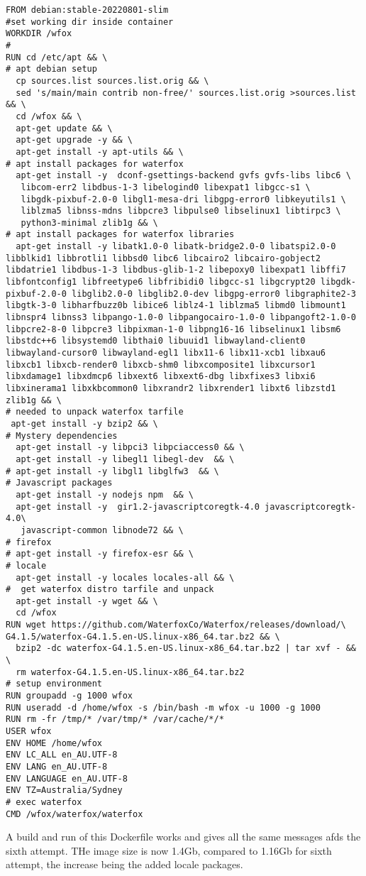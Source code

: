 \documentclass[a4paper]{article}  %
\begin{document}
\begin{tcolorbox}
\begin{verbatim}
FROM debian:stable-20220801-slim
#set working dir inside container
WORKDIR /wfox
#
RUN cd /etc/apt && \
# apt debian setup
  cp sources.list sources.list.orig && \
  sed 's/main/main contrib non-free/' sources.list.orig >sources.list && \
  cd /wfox && \
  apt-get update && \
  apt-get upgrade -y && \
  apt-get install -y apt-utils && \
# apt install packages for waterfox
  apt-get install -y  dconf-gsettings-backend gvfs gvfs-libs libc6 \
   libcom-err2 libdbus-1-3 libelogind0 libexpat1 libgcc-s1 \
   libgdk-pixbuf-2.0-0 libgl1-mesa-dri libgpg-error0 libkeyutils1 \
   liblzma5 libnss-mdns libpcre3 libpulse0 libselinux1 libtirpc3 \
   python3-minimal zlib1g && \
# apt install packages for waterfox libraries
  apt-get install -y libatk1.0-0 libatk-bridge2.0-0 libatspi2.0-0 libblkid1 libbrotli1 libbsd0 libc6 libcairo2 libcairo-gobject2 libdatrie1 libdbus-1-3 libdbus-glib-1-2 libepoxy0 libexpat1 libffi7 libfontconfig1 libfreetype6 libfribidi0 libgcc-s1 libgcrypt20 libgdk-pixbuf-2.0-0 libglib2.0-0 libglib2.0-dev libgpg-error0 libgraphite2-3 libgtk-3-0 libharfbuzz0b libice6 liblz4-1 liblzma5 libmd0 libmount1 libnspr4 libnss3 libpango-1.0-0 libpangocairo-1.0-0 libpangoft2-1.0-0 libpcre2-8-0 libpcre3 libpixman-1-0 libpng16-16 libselinux1 libsm6 libstdc++6 libsystemd0 libthai0 libuuid1 libwayland-client0 libwayland-cursor0 libwayland-egl1 libx11-6 libx11-xcb1 libxau6 libxcb1 libxcb-render0 libxcb-shm0 libxcomposite1 libxcursor1 libxdamage1 libxdmcp6 libxext6 libxext6-dbg libxfixes3 libxi6 libxinerama1 libxkbcommon0 libxrandr2 libxrender1 libxt6 libzstd1 zlib1g && \
# needed to unpack waterfox tarfile
 apt-get install -y bzip2 && \
# Mystery dependencies
  apt-get install -y libpci3 libpciaccess0 && \
  apt-get install -y libegl1 libegl-dev  && \
# apt-get install -y libgl1 libglfw3  && \
# Javascript packages
  apt-get install -y nodejs npm  && \
  apt-get install -y  gir1.2-javascriptcoregtk-4.0 javascriptcoregtk-4.0\
   javascript-common libnode72 && \
# firefox
# apt-get install -y firefox-esr && \
# locale
  apt-get install -y locales locales-all && \
#  get waterfox distro tarfile and unpack
  apt-get install -y wget && \
  cd /wfox 
RUN wget https://github.com/WaterfoxCo/Waterfox/releases/download/\
G4.1.5/waterfox-G4.1.5.en-US.linux-x86_64.tar.bz2 && \
  bzip2 -dc waterfox-G4.1.5.en-US.linux-x86_64.tar.bz2 | tar xvf - && \
  rm waterfox-G4.1.5.en-US.linux-x86_64.tar.bz2
# setup environment
RUN groupadd -g 1000 wfox
RUN useradd -d /home/wfox -s /bin/bash -m wfox -u 1000 -g 1000
RUN rm -fr /tmp/* /var/tmp/* /var/cache/*/*
USER wfox
ENV HOME /home/wfox
ENV LC_ALL en_AU.UTF-8
ENV LANG en_AU.UTF-8
ENV LANGUAGE en_AU.UTF-8
ENV TZ=Australia/Sydney
# exec waterfox
CMD /wfox/waterfox/waterfox
\end{verbatim}
\end{tcolorbox}
A build and run of this Dockerfile works and gives all the same messages afds the sixth attempt. THe image size is now 1.4Gb, compared to 1.16Gb for sixth attempt, the increase being the added locale packages.
\end{document}
